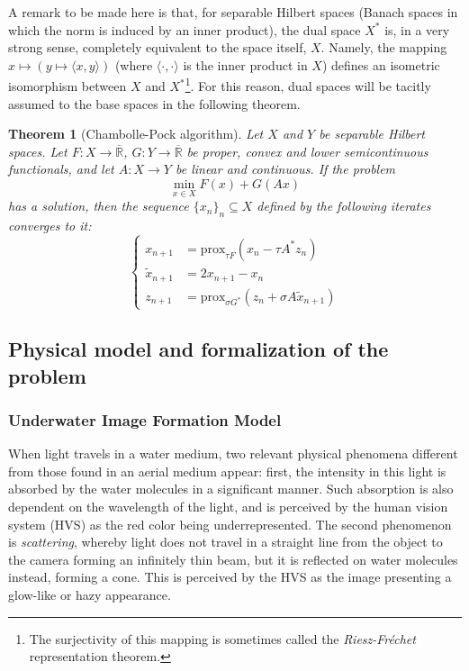 \documentclass[twocolumn,twoside,a4paper,10pt]{IEEEtran}
\newtheorem{theorem}{Theorem}
\begin{document}
A remark to be made here is that, for separable Hilbert spaces (Banach spaces in which the norm is induced by an inner product), the dual space \(X^*\) is,
in a very strong sense, completely equivalent to the space itself, \(X\). Namely,
the mapping \( x\mapsto (y\mapsto \langle x,y\rangle)\) (where \(\langle\cdot,\cdot\rangle\) is the inner product in \(X\)) defines an isometric isomorphism between \(X\) and \(X^*\)\footnote{The surjectivity of this mapping is sometimes called the \textit{Riesz-Fréchet} representation theorem.}. For this reason, dual spaces will be tacitly assumed to the base spaces in the following
theorem.

\begin{theorem}[Chambolle-Pock algorithm]\label{thm:chambolle-pock}
  Let \(X\) and \(Y\) be separable Hilbert spaces. Let \(F\colon X\to\overline{\mathbb{R}}\), \(G\colon Y\to\overline{\mathbb{R}}\) be proper, convex and lower semicontinuous functionals, and let \(A\colon X\to Y\) be linear and continuous. If the problem
  \[
    \min_{x\in X}F(x) + G(Ax)
  \]
  has a solution, then the sequence \(\{x_n\}_n\subseteq X\) defined by the following iterates converges to it:
  \begin{equation}\label{eq:iterates}
    \left\{
    \begin{split}
      x_{n+1} & = \text{prox}_{\tau F}(x_n - \tau A^*z_n) \\
      \tilde{x}_{n+1} & = 2x_{n+1} - x_n \\
      z_{n+1} & = \text{prox}_{\sigma G^*}(z_n + \sigma A\tilde{x}_{n+1})
    \end{split}
    \right.
  \end{equation}
\end{theorem}

\subsection{Physical model and formalization of the problem} \label{subsec:physical-model}
\subsubsection{Underwater Image Formation Model}
When light travels in a water medium, two relevant physical phenomena different from those found in an aerial medium appear: first, the intensity in this light
is absorbed by the water molecules in a significant manner. Such absorption is
also dependent on the wavelength of the light, and is perceived by the human vision system (HVS) as the red color being underrepresented. The second phenomenon is
\textit{scattering}, whereby light does not travel in a straight line from the
object to the camera forming an infinitely thin beam, but it is reflected on water molecules instead, forming a cone. This is perceived by the HVS as the image
presenting a glow-like or hazy appearance.
\end{document}
